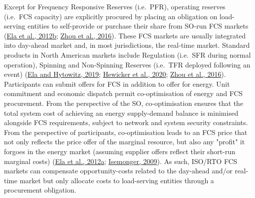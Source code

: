 \documentclass[12pt,a4paper,]{report}
\begin{document}
Except for Frequency Responsive Reserves (i.e.~PFR), operating reserves
(i.e.~FCS capacity) are explicitly procured by placing an obligation on
load-serving entities to self-provide or purchase their share from
SO-run FCS markets
(\protect\hyperlink{ref-elaAlternativeApproachesIncentivizing2012}{Ela
et al., 2012b};
\protect\hyperlink{ref-zhouSurveyAncillaryServices2016}{Zhou et al.,
2016}). These FCS markets are usually integrated into day-ahead market
and, in most jurisdictions, the real-time market. Standard products in
North American markets include Regulation (i.e.~SFR during normal
operation), Spinning and Non-Spinning Reserves (i.e.~TFR deployed
following an event)
(\protect\hyperlink{ref-elaAncillaryServicesUnited2019}{Ela and
Hytowitz, 2019};
\protect\hyperlink{ref-hewickerDimensioningControlReserves2020}{Hewicker
et al., 2020};
\protect\hyperlink{ref-zhouSurveyAncillaryServices2016}{Zhou et al.,
2016}). Participants can submit offers for FCS in addition to offer for
energy. Unit commitment and economic dispatch permit co-optimisation of
energy and FCS procurement. From the perspective of the SO,
co-optimisation ensures that the total system cost of achieving an
energy supply-demand balance is minimised alongside FCS requirements,
subject to network and system security constraints. From the perspective
of participants, co-optimisation leads to an FCS price that not only
reflects the price offer of the marginal resource, but also any "profit"
it forgoes in the energy market (assuming supplier offers reflect their
short-run marginal costs)
(\protect\hyperlink{ref-elaEffectiveAncillaryServices2012}{Ela et al.,
2012a};
\protect\hyperlink{ref-isemongerEvolvingDesignRTO2009}{Isemonger,
2009}). As such, ISO/RTO FCS markets can compensate opportunity-costs
related to the day-ahead and/or real-time market but only allocate costs
to load-serving entities through a procurement obligation.
\end{document}
